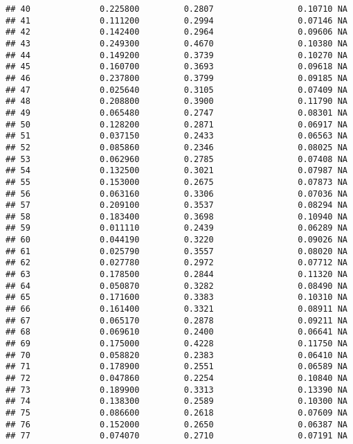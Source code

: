 \documentclass[
]{article}
\begin{document}
\begin{verbatim}
## 40              0.225800         0.2807                 0.10710 NA
## 41              0.111200         0.2994                 0.07146 NA
## 42              0.142400         0.2964                 0.09606 NA
## 43              0.249300         0.4670                 0.10380 NA
## 44              0.149200         0.3739                 0.10270 NA
## 45              0.160700         0.3693                 0.09618 NA
## 46              0.237800         0.3799                 0.09185 NA
## 47              0.025640         0.3105                 0.07409 NA
## 48              0.208800         0.3900                 0.11790 NA
## 49              0.065480         0.2747                 0.08301 NA
## 50              0.128200         0.2871                 0.06917 NA
## 51              0.037150         0.2433                 0.06563 NA
## 52              0.085860         0.2346                 0.08025 NA
## 53              0.062960         0.2785                 0.07408 NA
## 54              0.132500         0.3021                 0.07987 NA
## 55              0.153000         0.2675                 0.07873 NA
## 56              0.063160         0.3306                 0.07036 NA
## 57              0.209100         0.3537                 0.08294 NA
## 58              0.183400         0.3698                 0.10940 NA
## 59              0.011110         0.2439                 0.06289 NA
## 60              0.044190         0.3220                 0.09026 NA
## 61              0.025790         0.3557                 0.08020 NA
## 62              0.027780         0.2972                 0.07712 NA
## 63              0.178500         0.2844                 0.11320 NA
## 64              0.050870         0.3282                 0.08490 NA
## 65              0.171600         0.3383                 0.10310 NA
## 66              0.161400         0.3321                 0.08911 NA
## 67              0.065170         0.2878                 0.09211 NA
## 68              0.069610         0.2400                 0.06641 NA
## 69              0.175000         0.4228                 0.11750 NA
## 70              0.058820         0.2383                 0.06410 NA
## 71              0.178900         0.2551                 0.06589 NA
## 72              0.047860         0.2254                 0.10840 NA
## 73              0.189900         0.3313                 0.13390 NA
## 74              0.138300         0.2589                 0.10300 NA
## 75              0.086600         0.2618                 0.07609 NA
## 76              0.152000         0.2650                 0.06387 NA
## 77              0.074070         0.2710                 0.07191 NA

\end{verbatim}
\end{document}
